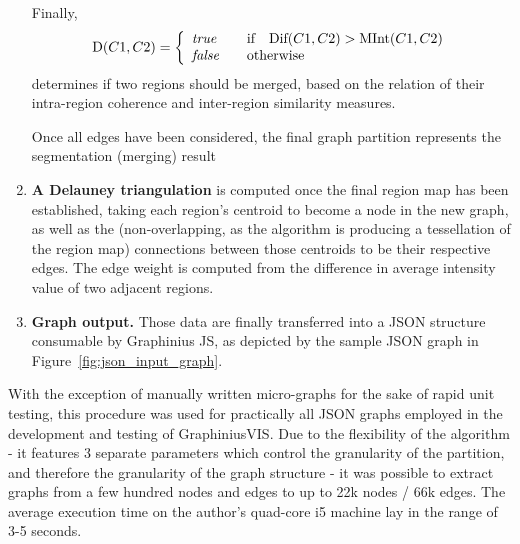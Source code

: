 \begin{enumerate}
		\par Finally,
		\begin{equation*}
		\text{D}(C1,C2) = \left\{
		\begin{array}{l l}
		\textit{true} & \quad \text{if} \quad \text{Dif}(C1,C2) > \text{MInt}(C1,C2)\\
		\textit{false} & \quad \text{otherwise}
		\end{array} \right.
		\end{equation*}
		determines if two regions should be merged, based on the relation of their intra-region coherence and inter-region similarity measures.
		
		\par Once all edges have been considered, the final graph partition represents the segmentation (merging) result
		
		\item \textbf{A Delauney triangulation} is computed once the final region map has been established, taking each region's centroid to become a node in the new graph, as well as the (non-overlapping, as the algorithm is producing a tessellation of the region map) connections between those centroids to be their respective edges. The edge weight is computed from the difference in average intensity value of two adjacent regions.

		\item \textbf{Graph output.} Those data are finally transferred into a JSON structure consumable by Graphinius JS, as depicted by the sample JSON graph in Figure~\ref{fig:json_input_graph}.
	\end{enumerate}
	
	With the exception of manually written micro-graphs for the sake of rapid unit testing, this procedure was used for practically all JSON graphs  employed in the development and testing of GraphiniusVIS. Due to the flexibility of the algorithm - it features 3 separate parameters which control the granularity of the partition, and therefore the granularity of the graph structure - it was possible to extract graphs from a few hundred nodes and edges to up to 22k nodes / 66k edges. The average execution time on the author's quad-core i5 machine lay in the range of 3-5 seconds.
		

